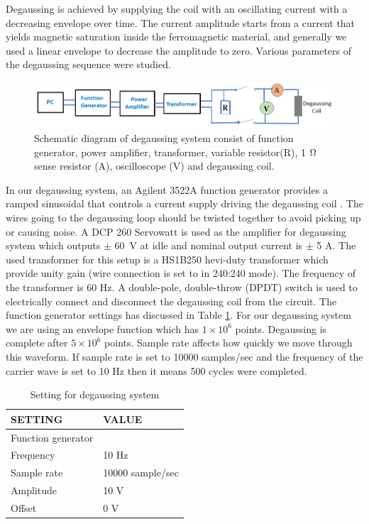 Degaussing is achieved by supplying the coil with an oscillating
current with a decreasing envelope over time. The current amplitude
starts from a current that yields magnetic saturation inside the
ferromagnetic material, and generally we used a linear envelope to
decrease the amplitude to zero.  Various parameters of the degaussing
sequence were studied.
\begin{figure}%
\centering
\includegraphics[width=1.0\linewidth]{figures/degaussing_system}
\caption{Schematic diagram of degaussing system consist of function
  generator, power amplifier, transformer, variable resistor(R), 1
  $\ohm$ sense resistor (A), oscilloscope (V) and degaussing
  coil. \label{fig:schematic-of-degaussing_system.}}
\end{figure}

In our degaussing system, an Agilent 3522A function generator  provides a ramped sinusoidal that controls a current supply driving the degaussing coil \cite{Martin:2014foa}. The wires going to the degaussing loop should be twisted together to avoid picking up or causing noise.  A DCP 260 Servowatt is used as the amplifier for degaussing system which outputs $\pm$ 60~V at idle and nominal output current is  $\pm$ 5 A. The used transformer for this setup is a  HS1B250 hevi-duty transformer which provide unity gain (wire connection is set to in 240:240 mode). The frequency of the transformer is  60 Hz.  A double-pole, double-throw (DPDT) switch is used to electrically connect and disconnect the degaussing coil from the circuit. The function generator settings has discussed in Table \ref{table:degaussing setting}. For our degaussing system we are using an envelope function which has $1\times 10^6$ points. Degaussing is complete after $5\times 10^6$ points. Sample rate affects how quickly we move through this waveform. If sample rate is set to 10000 samples/sec and the frequency of the carrier wave is set to 10 Hz then it means 500 cycles were completed. 
 \begin{table}%
\centering
\begin{tabular}{|l|l|}
\hline
\textbf{ SETTING}    & \textbf{ VALUE} \\
\hline
Function generator &   \\
\hline
Frequency &  10 Hz   \\
Sample rate    &  10000 sample/sec  \\
Amplitude   &   10 V \\
Offset  &       0 V  \\
\hline
\end{tabular}
\caption{Setting for degaussing system \label{table:degaussing setting}}
\end{table}


